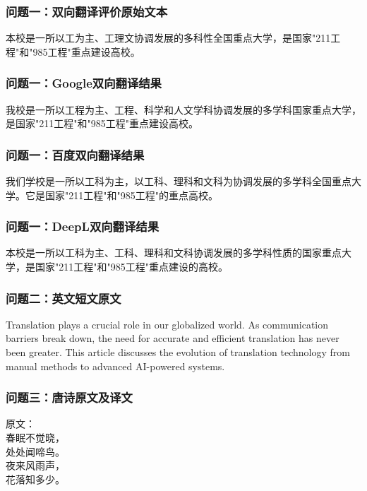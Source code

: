 \documentclass[bwprint]{cumcmthesis}
\begin{document}
\begin{appendices}
\subsubsection{问题一：双向翻译评价原始文本}
\begin{mdframed}
本校是一所以工为主、工理文协调发展的多科性全国重点大学，是国家"211工程"和"985工程"重点建设高校。
\end{mdframed}

\subsubsection{问题一：Google双向翻译结果}
\begin{mdframed}
我校是一所以工程为主、工程、科学和人文学科协调发展的多学科国家重点大学，是国家"211工程"和"985工程"重点建设高校。
\end{mdframed}

\subsubsection{问题一：百度双向翻译结果}
\begin{mdframed}
我们学校是一所以工科为主，以工科、理科和文科为协调发展的多学科全国重点大学。它是国家"211工程"和"985工程"的重点高校。
\end{mdframed}

\subsubsection{问题一：DeepL双向翻译结果}
\begin{mdframed}
本校是一所以工科为主、工科、理科和文科协调发展的多学科性质的国家重点大学，是国家"211工程"和"985工程"重点建设的高校。
\end{mdframed}

\subsubsection{问题二：英文短文原文}
\begin{mdframed}
Translation plays a crucial role in our globalized world. As communication barriers break down, the need for accurate and efficient translation has never been greater. This article discusses the evolution of translation technology from manual methods to advanced AI-powered systems.
\end{mdframed}

\subsubsection{问题三：唐诗原文及译文}
\begin{mdframed}
原文：\\
春眠不觉晓，\\
处处闻啼鸟。\\
夜来风雨声，\\
花落知多少。


\end{mdframed}
\end{appendices}
\end{document}
